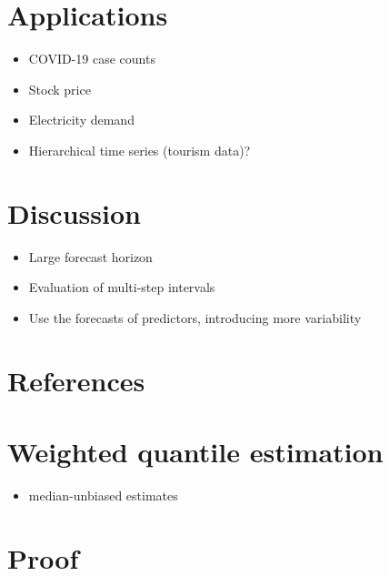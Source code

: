\documentclass[
  11pt,
  a4paper,
]{article}
\providecommand{\tightlist}{%
  \setlength{\itemsep}{0pt}\setlength{\parskip}{0pt}}\usepackage{longtable,booktabs,array}
\theoremstyle{plain}
\theoremstyle{plain}
\theoremstyle{remark}
\begin{document}
\section{Applications}\label{applications}

\begin{itemize}
\item
  COVID-19 case counts
\item
  Stock price
\item
  Electricity demand
\item
  Hierarchical time series (tourism data)?
\end{itemize}

\section{Discussion}\label{discussion}

\begin{itemize}
\item
  Large forecast horizon
\item
  Evaluation of multi-step intervals
\item
  Use the forecasts of predictors, introducing more variability
\end{itemize}

\section*{References}\label{references}

\printbibliography[heading=none]

\newpage
\appendix
\setcounter{section}{0}
\renewcommand{\thesection}{Appendix \Alph{section}}
\renewcommand{\thesubsection}{\Alph{section}.\arabic{subsection}}
\renewcommand{\thefigure}{A\arabic{figure}}
\renewcommand{\thetable}{A\arabic{table}}
\setcounter{figure}{0}
\setcounter{table}{0}

\section{Weighted quantile estimation}\label{sec-wq}

\begin{itemize}
\tightlist
\item
  median-unbiased estimates
\end{itemize}

\section{Proof}\label{sec-proof}
\end{document}
